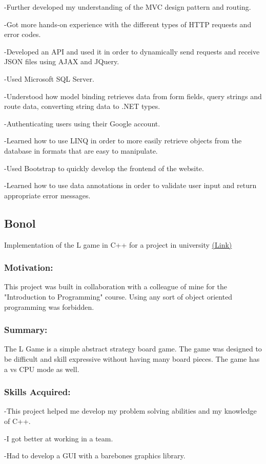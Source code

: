 \documentclass[a4paper,hidelinks,12pt]{article}
\begin{document}
-Further developed my understanding of the MVC design pattern and routing.

-Got more hands-on experience with the different types of HTTP requests and error codes.

-Developed an API and used it in order to dynamically send requests and receive JSON files using AJAX and JQuery.

-Used Microsoft SQL Server.  

-Understood how model binding retrieves data from form fields, query strings and route data, converting string
data to .NET types.

-Authenticating users using their Google account.

-Learned how to use LINQ in order to more easily retrieve objects from the database in formats that are easy
to manipulate.

-Used Bootstrap to quickly develop the frontend of the website.

-Learned how to use data annotations in order to validate user input and return appropriate error messages.


\subsection{Bonol}
Implementation of the L game in C++ for a project in university \href{https://github.com/IureaMarius/ProiectIP}{(Link)}
\subsubsection{Motivation:}
This project was built in collaboration with a colleague of mine for the "Introduction to Programming" course.
Using any sort of object oriented programming was forbidden.
\subsubsection{Summary:}
The L Game is a simple abstract strategy board game. The game was designed to be difficult and skill expressive
without having many board pieces. The game has a vs CPU mode as well.
\subsubsection{Skills Acquired:}
-This project helped me develop my problem solving abilities and my knowledge of C++.

-I got better at working in a team.

-Had to develop a GUI with a barebones graphics library.
\end{document}
